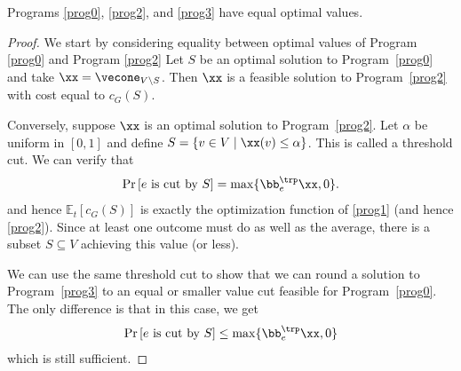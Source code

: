 \begin{lemma}
  Programs \eqref{prog0}, \eqref{prog2}, and \eqref{prog3} have equal optimal values.
\end{lemma}
\begin{proof}
  We start by considering equality between optimal values of Program
  \eqref{prog0} and Program \eqref{prog2}
  Let $S$ be an optimal solution to Program~\eqref{prog0} and take $\xx = \vecone_{V\setminus S}$. Then $\xx$ is a
  feasible solution to Program~\eqref{prog2} with cost equal to $c_G(S)$.

  Conversely, suppose $\xx$ is an optimal solution to Program~\eqref{prog2}. Let $\alpha$ be uniform in $[0,1]$ and define
  $S = \{v\in V\mid\xx(v) \leq \alpha\}$. This is called a threshold cut.
  We can verify that
  \[ \Pr\left[\text{$e$ is cut by $S$}\right] = \max\{\bb_e^\trp \xx, 0\}. \]
  and hence $\mathbb{E}_t [c_G(S)]$ is exactly the optimization function of \ref{prog1} (and hence
  \ref{prog2}).
  Since at least one outcome must do as well as the average, there is a subset $S\subseteq V$ achieving this value
  (or less).

  We can use the same threshold cut to show that we can round a
  solution to Program~\eqref{prog3} to an equal or smaller value cut
  feasible for Program~\eqref{prog0}. The only difference is that in
  this case, we get
  \[
    \Pr\left[\text{$e$ is cut by $S$}\right] \leq \max\{\bb_e^\trp \xx, 0\}
  \]
  which is still sufficient.
\end{proof}



%
